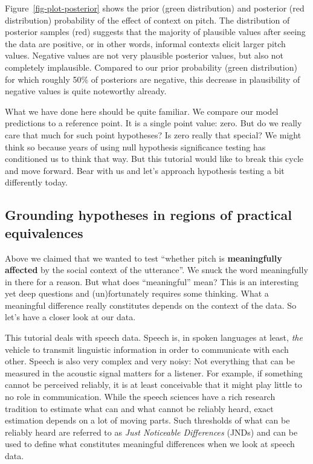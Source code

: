 \documentclass[
  doc,
  floatsintext,
  longtable,
  nolmodern,
  notxfonts,
  notimes,
  colorlinks=true,linkcolor=blue,citecolor=blue,urlcolor=blue]{apa7}
\begin{document}
Figure~\ref{fig-plot-posterior} shows the prior (green distribution) and
posterior (red distribution) probability of the effect of context on
pitch. The distribution of posterior samples (red) suggests that the
majority of plausible values after seeing the data are positive, or in
other words, informal contexts elicit larger pitch values. Negative
values are not very plausible posterior values, but also not completely
implausible. Compared to our prior probability (green distribution) for
which roughly 50\% of posteriors are negative, this decrease in
plausibility of negative values is quite noteworthy already.

What we have done here should be quite familiar. We compare our model
predictions to a reference point. It is a single point value: zero. But
do we really care that much for such point hypotheses? Is zero really
that special? We might think so because years of using null hypothesis
significance testing has conditioned us to think that way. But this
tutorial would like to break this cycle and move forward. Bear with us
and let's approach hypothesis testing a bit differently today.

\subsection{Grounding hypotheses in regions of practical
equivalences}\label{grounding-hypotheses-in-regions-of-practical-equivalences}

Above we claimed that we wanted to test ``whether pitch is
\textbf{meaningfully affected} by the social context of the utterance''.
We snuck the word meaningfully in there for a reason. But what does
``meaningful'' mean? This is an interesting yet deep questions and
(un)fortunately requires some thinking. What a meaningful difference
really constitutes depends on the context of the data. So let's have a
closer look at our data.

This tutorial deals with speech data. Speech is, in spoken languages at
least, \emph{the} vehicle to transmit linguistic information in order to
communicate with each other. Speech is also very complex and very noisy:
Not everything that can be measured in the acoustic signal matters for a
listener. For example, if something cannot be perceived reliably, it is
at least conceivable that it might play little to no role in
communication. While the speech sciences have a rich research tradition
to estimate what can and what cannot be reliably heard, exact estimation
depends on a lot of moving parts. Such thresholds of what can be
reliably heard are referred to as \emph{Just Noticeable Differences}
(JNDs) and can be used to define what constitutes meaningful differences
when we look at speech data.
\end{document}
